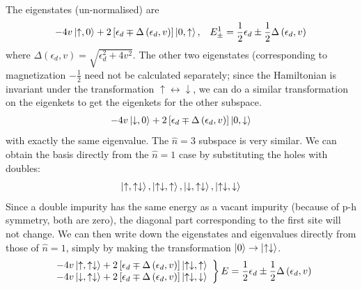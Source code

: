 \documentclass[12pt,twoside]{article}
\numberwithin{equation}{section}
\begin{document}
The eigenstates (un-normalised) are
\begin{equation}\begin{aligned}
\label{low}
	-4v\ket{\uparrow,0} +2 \left[ \epsilon_d \mp \Delta\left(\epsilon_d , v\right)\right] \ket{0, \uparrow}, && E^1_\pm = \frac{1}{2} \epsilon_d \pm \frac{1}{2}\Delta\left(\epsilon_d , v\right)
\end{aligned}\end{equation}
where \(\Delta\left(\epsilon_d , v\right)  = \sqrt{\epsilon_d^2 + 4 v^2}\). The other two eigenstates (corresponding to magnetization \(- \frac{1}{2}\) need not be calculated separately; since the Hamiltonian is invariant under the transformation \( \uparrow \leftrightarrow \downarrow\), we can do a similar transformation on the eigenkets to get the eigenkets for the other subspace.
\begin{equation}\begin{aligned}
	-4v\ket{\downarrow,0} + 2 \left[ \epsilon_d \mp \Delta\left(\epsilon_d , v \right)\right] \ket{0, \downarrow}
\end{aligned}\end{equation}
with exactly the same eigenvalue.
\pb The \(\hat n = 3\) subspace is very similar. We can obtain the basis directly from the \(\hat n = 1\) case by substituting the holes with doubles:
\begin{equation}\begin{aligned}
	\ket{\uparrow,\uparrow \downarrow}, \ket{\uparrow \downarrow,\uparrow}, \ket{\downarrow,\uparrow \downarrow}, \ket{\uparrow \downarrow,\downarrow}
\end{aligned}\end{equation}
Since a double impurity has the same energy as a vacant impurity (because of p-h symmetry, both are zero), the diagonal part corresponding to the first site will not change. We can then write down the eigenstates and eigenvalues directly from those of \(\hat n=1\), simply by making the transformation \(\ket{0} \to \ket{ \uparrow \downarrow}\).
\begin{align}
	\left.
	\begin{array}{l}
	-4v \ket{\uparrow,\uparrow \downarrow} +  2\left[ \epsilon_d \mp \Delta\left(\epsilon_d , v\right)  \right] \ket{\uparrow \downarrow, \uparrow}\\
	-4v \ket{\downarrow,\uparrow \downarrow} + 2 \left[ \epsilon_d \mp \Delta\left(\epsilon_d, v\right)  \right] \ket{\uparrow \downarrow, \downarrow}\end{array}
	\right\}
	E = \frac{1}{2} \epsilon_d \pm \frac{1}{2}\Delta\left(\epsilon_d , v \right)
\end{align}
\end{document}
